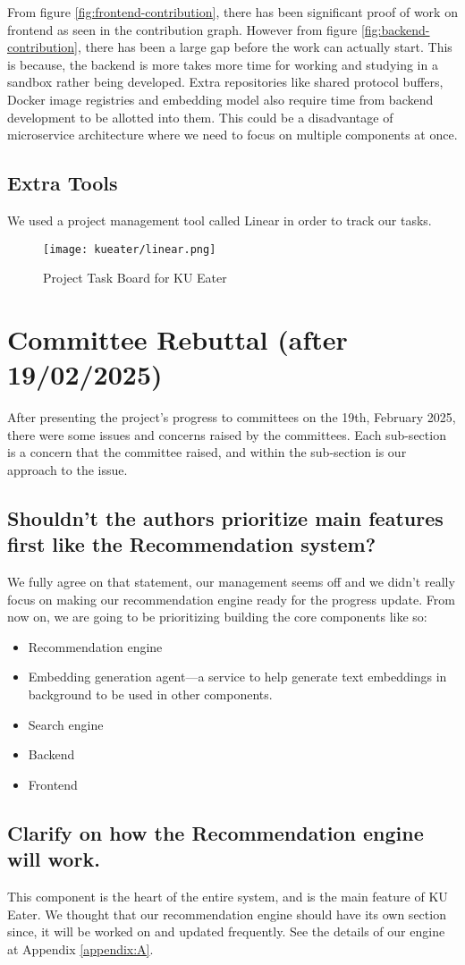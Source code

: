 From figure \ref{fig:frontend-contribution}, there has been significant proof of work on frontend as seen in the contribution graph.
However from figure \ref{fig:backend-contribution}, there has been a large gap before the work can actually start. This is because, the backend
is more takes more time for working and studying in a sandbox rather being developed. Extra repositories like shared protocol buffers, Docker image registries and
embedding model also require time from backend development to be allotted into them. This could be a disadvantage of microservice architecture where
we need to focus on multiple components at once.

\subsection{Extra Tools}
We used a project management tool called Linear in order to track our tasks.
\begin{figure}[H]
    \centering
    \texttt{[image: kueater/linear.png]}
    \caption{Project Task Board for KU Eater}
    \label{fig:linear}
\end{figure}

\section{Committee Rebuttal (after 19/02/2025)}
\label{section:2nd-update-rebuttal}
After presenting the project's progress to committees on the 19th, February 2025, there were some issues and concerns raised by the committees.
Each sub-section is a concern that the committee raised, and within the sub-section is our approach to the issue.

\subsection*{Shouldn't the authors prioritize main features first like the Recommendation system?}
We fully agree on that statement, our management seems off and we didn't really focus on making our recommendation engine ready for the progress update.
From now on, we are going to be prioritizing building the core components like so:
\begin{itemize}[leftmargin=80pt]
    \item Recommendation engine
    \item Embedding generation agent---a service to help generate text embeddings in background to be used in other components.
    \item Search engine
    \item Backend
    \item Frontend
\end{itemize}

\subsection*{Clarify on how the Recommendation engine will work.}
This component is the heart of the entire system, and is the main feature of KU Eater. We thought that our recommendation engine should have
its own section since, it will be worked on and updated frequently. See the details of our engine at Appendix \ref{appendix:A}.
